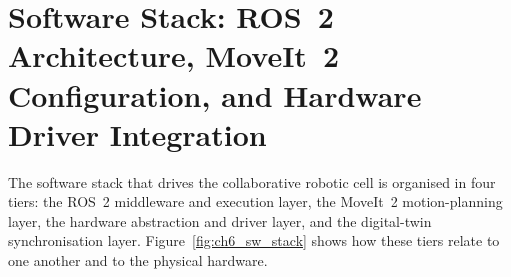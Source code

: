 \section{Software Stack: ROS~2 Architecture, MoveIt~2 Configuration,
         and Hardware Driver Integration}
\label{sec:ch6_software}

The software stack that drives the collaborative robotic cell is organised in four tiers:
the ROS~2 middleware and execution layer, the MoveIt~2 motion-planning layer, the hardware
abstraction and driver layer, and the digital-twin synchronisation layer.
Figure~\ref{fig:ch6_sw_stack} shows how these tiers relate to one another and to the physical
hardware.

